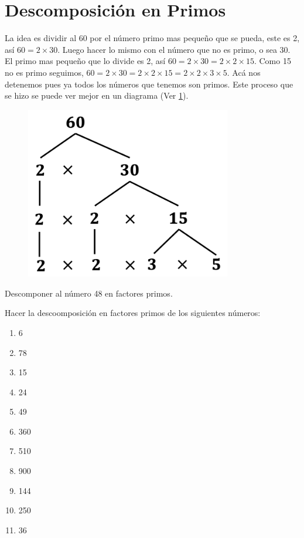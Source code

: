 \section{Descomposición en Primos}
\begin{ejemplo} La idea es dividir al 60 por el número primo mas pequeño que se pueda, este es 2, así $60=2\times 30$. Luego hacer lo mismo con el número que no es primo, o sea 30. El primo mas pequeño que lo divide es 2, así $60=2\times 30=2\times 2\times 15$. Como 15 no es primo seguimos, $60=2\times 30=2\times 2\times 15=2\times 2\times3\times 5$. Acá nos detenemos pues ya todos los números que tenemos son primos. Este proceso que se hizo se puede ver mejor en un diagrama (Ver \ref{descomposicionenfactores60}).
	
	\begin{figure}[htbp]
		\centering
		\includegraphics[width=90mm]{TN/imgs/descomposicion_en_factores_60}
		\label{descomposicionenfactores60}
	\end{figure}
	
	\begin{exer}
		Descomponer al número 48 en factores primos.
	\end{exer}
	
	\begin{exer}
		Hacer la descoomposición en factores primos de los siguientes números:
		\begin{multicols}{3}
			\begin{enumerate}[label={\alph*})]
				\item 6
				\item 78
				\item 15
				\item 24
				\item 49
				\item 360
				\item 510
				\item 900
				\item 144
				\item 250
				\item 36
			\end{enumerate}
		\end{multicols}
	\end{exer}
\end{ejemplo}

